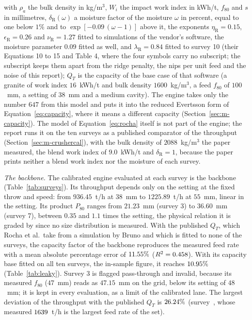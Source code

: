 with $\rho_a$ the bulk density in kg/m$^3$, $W_i$ the impact work index in kWh/t, $f_{80}$ and $s$ in millimetres, $\delta_{\mathrm R}(\omega)$ a
moisture factor of the moisture $\omega$ in percent, equal to one below $1\%$ and to $\exp[-0.09\,(\omega-1)]$ above it, the exponents
$\eta_{\mathrm R}=0.15$, $\epsilon_{\mathrm R}=0.26$ and $\nu_{\mathrm R}=1.27$ fitted to simulations of the vendor's software, the moisture
parameter $0.09$ fitted as well, and $\lambda_{\mathrm R}=0.84$ fitted to survey 10 (their Equations 10 to 15 and Table 4, where the four
symbols carry no subscript; the subscript keeps them apart from the ridge penalty, the nips per unit feed and the noise of this report); $Q_T$ is the capacity of the base case of
that software (a granite of work index $16$~kWh/t and bulk density $1600$~kg/m$^3$, a feed $f_{80}$ of $100$~mm, a setting of $38$~mm and a
medium cavity). The engine takes only the number $647$ from this model and puts it into the reduced Evertsson form of
Equation~\eqref{eq:capacity}, where it means a different capacity (Section~\ref{sec:m-capacity}). The model of Equation~\eqref{eq:rocha}
itself is not part of the engine; the report runs it on the ten surveys as a published comparator of the throughput
(Section~\ref{sec:m-crushercal}), with the bulk density of $2088$~kg/m$^3$ the paper measured, the blend work index of $9.0$~kWh/t and
$\delta_{\mathrm R}=1$, because the paper prints neither a blend work index nor the moisture of each survey.

\emph{The backbone.} The calibrated engine evaluated at each survey is the backbone (Table~\ref{tab:surveys}). Its throughput depends only on the
setting at the fixed throw and speed: from $936.45$~t/h at $38$~mm to $1225.89$~t/h at $55$~mm, linear in the setting. Its product $P_{80}$ ranges
from $21.23$~mm (survey 3) to $36.60$~mm (survey 7), between $0.35$ and $1.1$ times the setting, the physical relation it is graded by since no
size distribution is measured. With the published $Q_T$, which Rocha et al.\ take from a simulation by Bruno and which is fitted
to none of the surveys, the capacity factor of the backbone reproduces the measured feed rate with a mean absolute percentage error of
$11.55\%$ ($R^2=0.458$). With its capacity base fitted on all ten surveys, the in-sample figure, it reaches
$10.95\%$ (Table~\ref{tab:leaky}). Survey 3 is flagged pass-through and invalid, because its measured $f_{80}$ ($47$~mm)
reads as $47.15$~mm on the grid, below its setting of $48$~mm; it is kept in every evaluation, as a limit of the calibrated lane. The
largest deviation of the throughput with the published $Q_T$ is $26.24\%$ (survey~\bbShipMaxdevSurvey, whose measured
$1639$~t/h is the largest feed rate of the set).

